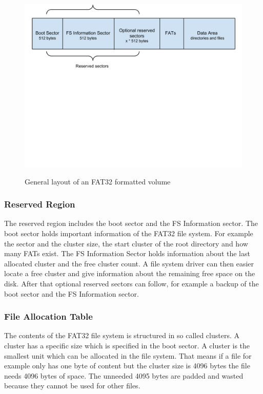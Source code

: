 \begin{figure}[h!]
\caption{General layout of an FAT32 formatted volume}
\centering
\includegraphics[scale=0.62]{figures/fat_general}
\label{figure:general_fat32_layout}
\end{figure}


\subsubsection{Reserved Region}

The reserved region includes the boot sector and the FS Information sector. The boot sector holds important information of the FAT32 file system. For example the sector and the cluster size, the start cluster of the root directory and how many FATs exist. The FS Information Sector holds information about the last allocated cluster and the free cluster count. A file system driver can then easier locate a free cluster and give information about the remaining free space on the disk. After that optional reserved sectors can follow, for example a backup of the boot sector and the FS Information sector\cite{usb_ms_jan}.

\subsubsection{File Allocation Table}

The contents of the FAT32 file system is structured in so called clusters. A cluster has a specific size which is specified in the boot sector. A cluster is the smallest unit which can be allocated in the file system. That means if a file for example only has one byte of content but the cluster size is 4096 bytes the file needs 4096 bytes of space. The unneeded 4095 bytes are padded and wasted because they cannot be used for other files.

